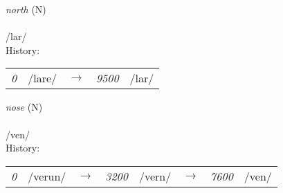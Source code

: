\vspace{15pt}
\begin{nopagebreak}
 \textit{north} (N)\\
\\
\noindent /l{\textprimstress}ar/\\


\noindent History:

\vspace{-0pt}
\hspace{40pt}
\begin{tabular}{ccc}
\textit{0} & /lare/&$\rightarrow$ & \textit{9500} & /lar/& \\
\end{tabular}

\vspace{20pt}\hline

\end{nopagebreak}
\filbreak



\vspace{15pt}
\begin{nopagebreak}
 \textit{nose} (N)\\
\\
\noindent /v{\textprimstress}en/\\


\noindent History:

\vspace{-0pt}
\hspace{40pt}
\begin{tabular}{ccc}
\textit{0} & /verun/&$\rightarrow$ & \textit{3200} & /vern/&$\rightarrow$ & \textit{7600} & /ven/& \\
\end{tabular}

\vspace{20pt}\hline

\end{nopagebreak}
\filbreak



